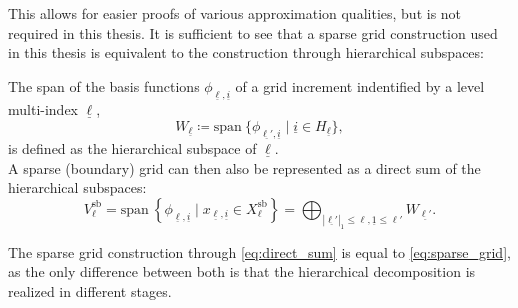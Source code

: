 \documentclass[
  a4paper,  %
  twoside,  %
  bibliography=totoc,
  headsepline,
  cleardoublepage=empty,
  parskip=half,
  draft=false
]{scrbook}
\begin{document}
This allows for easier proofs of various approximation qualities, but is not required in this thesis.
It is sufficient to see that a sparse grid construction used in this thesis is equivalent to the construction through hierarchical subspaces:
\begin{definition}
The span of the basis functions $\phi_{\underline{\ell},\underline{i}}$ of a grid increment indentified by a level multi-index $\underline{\ell}$,
\begin{equation}
W_{\underline{\ell}} \coloneqq \mathrm{span}~ \{\phi_{\underline{\ell'},\underline{i}} \mid \underline{i} \in H_{\underline{\ell}}\},
\end{equation}
is defined as the hierarchical subspace of $\underline{\ell}$.\\
A sparse (boundary) grid can then also be represented as a direct sum of the hierarchical subspaces:
\begin{equation}
V^{\mathrm{sb}}_{\ell} = \mathrm{span}~ \left\{\phi_{\underline{\ell},\underline{i}} \mid x_{\underline{\ell},\underline{i}} \in X^{\mathrm{sb}}_{\ell}\right\}=\bigoplus_{|\underline{\ell'}|_1 \leq \ell, \underline{1} \leq \ell'} W_{\underline{\ell'}}.
\label{eq:direct_sum}
\end{equation}
\end{definition}
%
The sparse grid construction through \cref{eq:direct_sum} is equal to \cref{eq:sparse_grid}, as the only difference between both is that the hierarchical decomposition is realized in different stages.
\end{document}

